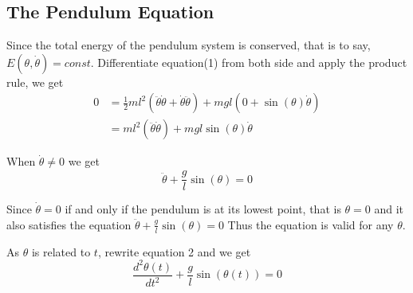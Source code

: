 \documentclass{article}
\begin{document}
\subsection{The Pendulum Equation}
\par  Since the total energy of the pendulum system is conserved, that is to say, $E (\theta, \dot{\theta}) = const $. Differentiate equation(1) from both side and apply the product rule, we get 
\begin{equation*}
 \begin{aligned}
0  & =  \frac{1}{2} m l^2 ( \ddot{\theta} \dot{\theta} +\dot{\theta} \ddot{\theta}) + mgl (0 +\sin(\theta) \dot{\theta} )\\
    & =  m l^2 ( \ddot{\theta} \dot{\theta}) + mgl\sin(\theta) \dot{\theta}
  \end{aligned}
\end{equation*}
	\par When $\dot{\theta} \neq 0$ we get
\begin{equation*}
\ddot{\theta}+\frac{g}{l}\sin(\theta) = 0
\end{equation*}
\par Since $\dot{\theta} = 0$ if and only if the pendulum is at its lowest point, that is $\theta = 0$ and it also satisfies the equation $ \ddot{\theta}+\frac{g}{l}\sin(\theta) = 0 $ Thus the equation is valid for any $\theta$.
	\par As $\theta$ is related to $t$, rewrite equation 2 and we get 
\begin{equation*}
\frac{d^2 \theta(t)}{dt^2} + \frac{g}{l}\sin(\theta (t)) =0
\end{equation*}
\end{document}

